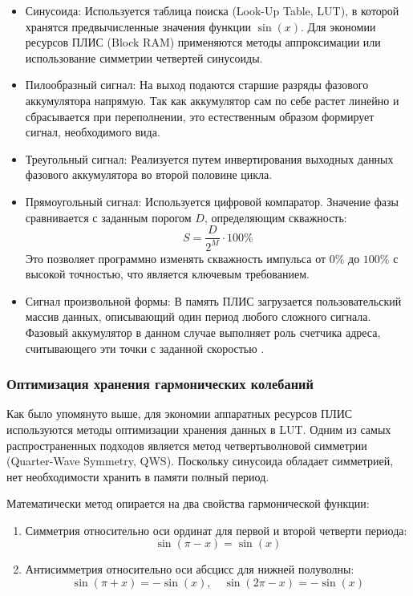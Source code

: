 \documentclass[12pt,a4paper,TimesNewRoman]{article}
\begin{document}
\begin{itemize}
    \item Синусоида: Используется таблица поиска (Look-Up Table, LUT), в которой хранятся предвычисленные значения функции $\sin(x)$. Для экономии ресурсов ПЛИС (Block RAM) применяются методы аппроксимации или использование симметрии четвертей синусоиды.
    \item Пилообразный сигнал: На выход подаются старшие разряды фазового аккумулятора напрямую. Так как аккумулятор сам по себе растет линейно и сбрасывается при переполнении, это естественным образом формирует сигнал, необходимого вида.
    \item Треугольный сигнал: Реализуется путем инвертирования выходных данных фазового аккумулятора во второй половине цикла.
    \item Прямоугольный сигнал: Используется цифровой компаратор. Значение фазы сравнивается с заданным порогом $D$, определяющим скважность:
    \begin{equation}
        S = \frac{D}{2^M}\cdot 100\%
    \end{equation}
    Это позволяет программно изменять скважность импульса от $0\%$ до $100\%$ с высокой точностью, что является ключевым требованием.
    \item Сигнал произвольной формы: В память ПЛИС загрузается пользовательский массив данных, описывающий один период любого сложного сигнала. Фазовый аккумулятор в данном случае выполняет роль счетчика адреса, считывающего эти точки с заданной скоростью \cite{arbitrary}.
\end{itemize}

\subsubsection{Оптимизация хранения гармонических колебаний}

Как было упомянуто выше, для экономии аппаратных ресурсов ПЛИС используются методы оптимизации хранения данных в LUT. Одним из самых распространенных подходов является метод четвертьволновой симметрии (Quarter-Wave Symmetry, QWS). Поскольку синусоида обладает симметрией, нет необходимости хранить в памяти полный период.

Математически метод опирается на два свойства гармонической функции:
\begin{enumerate}
    \item Симметрия относительно оси ординат для первой и второй четверти периода: \[\sin(\pi - x) = \sin(x)\]
    \item Антисимметрия относительно оси абсцисс для нижней полуволны: \[
        \sin(\pi+x)=-\sin(x), \quad \sin(2\pi-x)=-\sin(x)
    \]
\end{enumerate}
\end{document}
